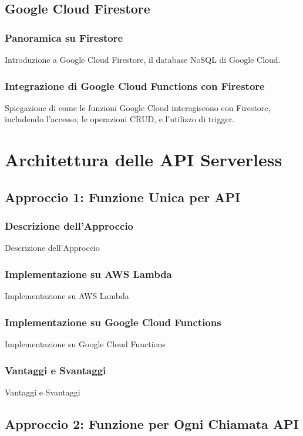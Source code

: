 \documentclass[12pt,a4paper,twoside]{book}
\begin{document}
\section{Google Cloud Firestore}
\subsection{Panoramica su Firestore}
Introduzione a Google Cloud Firestore, il database NoSQL di Google Cloud.

\subsection{Integrazione di Google Cloud Functions con Firestore}
Spiegazione di come le funzioni Google Cloud interagiscono con Firestore, includendo l'accesso, le operazioni CRUD, e l'utilizzo di trigger.

\chapter{Architettura delle API Serverless}
\section{Approccio 1: Funzione Unica per API}
\subsection{Descrizione dell’Approccio}
Descrizione dell’Approccio

\subsection{Implementazione su AWS Lambda}
Implementazione su AWS Lambda

\subsection{Implementazione su Google Cloud Functions}
Implementazione su Google Cloud Functions

\subsection{Vantaggi e Svantaggi}
Vantaggi e Svantaggi

\section{Approccio 2: Funzione per Ogni Chiamata API}
\end{document}
